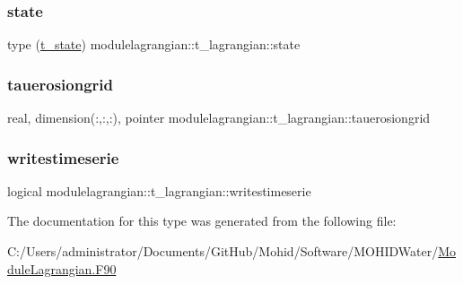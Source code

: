 \subsubsection{\texorpdfstring{state}{state}}
{\footnotesize\ttfamily type (\mbox{\hyperlink{structmodulelagrangian_1_1t__state}{t\+\_\+state}}) modulelagrangian\+::t\+\_\+lagrangian\+::state\hspace{0.3cm}{\ttfamily [private]}}

\mbox{\label{structmodulelagrangian_1_1t__lagrangian_a9ec86edf4cbd0b4d12ddfb31439590d4}} 
\subsubsection{\texorpdfstring{tauerosiongrid}{tauerosiongrid}}
{\footnotesize\ttfamily real, dimension(\+:,\+:,\+:), pointer modulelagrangian\+::t\+\_\+lagrangian\+::tauerosiongrid\hspace{0.3cm}{\ttfamily [private]}}

\mbox{\label{structmodulelagrangian_1_1t__lagrangian_ae9dc3b9b0c396aaa2acf6f70301528a7}} 
\subsubsection{\texorpdfstring{writestimeserie}{writestimeserie}}
{\footnotesize\ttfamily logical modulelagrangian\+::t\+\_\+lagrangian\+::writestimeserie\hspace{0.3cm}{\ttfamily [private]}}



The documentation for this type was generated from the following file\+:\begin{DoxyCompactItemize}
\item 
C\+:/\+Users/administrator/\+Documents/\+Git\+Hub/\+Mohid/\+Software/\+M\+O\+H\+I\+D\+Water/\mbox{\hyperlink{_module_lagrangian_8_f90}{Module\+Lagrangian.\+F90}}\end{DoxyCompactItemize}
